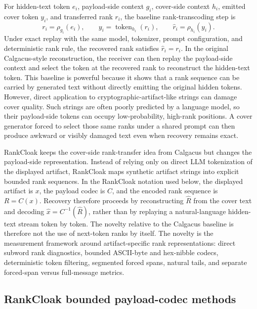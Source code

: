 \documentclass[fleqn,10pt]{wlscirep}
\begin{document}
For hidden-text token \(e_i\), payload-side context \(g_i\), cover-side context \(h_i\), emitted cover token \(y_i\), and transferred rank \(r_i\), the baseline rank-transcoding step is
\begin{equation}
r_i=\rho_{g_i}(e_i),
\qquad
y_i=\operatorname{token}_{h_i}(r_i),
\qquad
\hat r_i=\rho_{h_i}(y_i).
\label{eq:calgacus-rank-transcoding}
\end{equation}
Under exact replay with the same model, tokenizer, prompt configuration, and deterministic rank rule, the recovered rank satisfies \(\hat r_i=r_i\). In the original Calgacus-style reconstruction, the receiver can then replay the payload-side context and select the token at the recovered rank to reconstruct the hidden-text token.
This baseline is powerful because it shows that a rank sequence can be carried by generated text without directly emitting the original hidden tokens. However, direct application to cryptographic-artifact-like strings can damage cover quality. Such strings are often poorly predicted by a language model, so their payload-side tokens can occupy low-probability, high-rank positions. A cover generator forced to select those same ranks under a shared prompt can then produce awkward or visibly damaged text even when recovery remains exact.

RankCloak keeps the cover-side rank-transfer idea from Calgacus but changes the payload-side representation. Instead of relying only on direct LLM tokenization of the displayed artifact, RankCloak maps synthetic artifact strings into explicit bounded rank sequences. In the RankCloak notation used below, the displayed artifact is \(x\), the payload codec is \(C\), and the encoded rank sequence is \(R=C(x)\). Recovery therefore proceeds by reconstructing \(\hat R\) from the cover text and decoding \(\hat{x}=C^{-1}(\hat R)\), rather than by replaying a natural-language hidden-text stream token by token.
The novelty relative to the Calgacus baseline is therefore not the use of next-token ranks by itself. The novelty is the measurement framework around artifact-specific rank representations: direct subword rank diagnostics, bounded ASCII-byte and hex-nibble codecs, deterministic token filtering, segmented forced spans, natural tails, and separate forced-span versus full-message metrics.


\subsection*{RankCloak bounded payload-codec methods}
\end{document}
